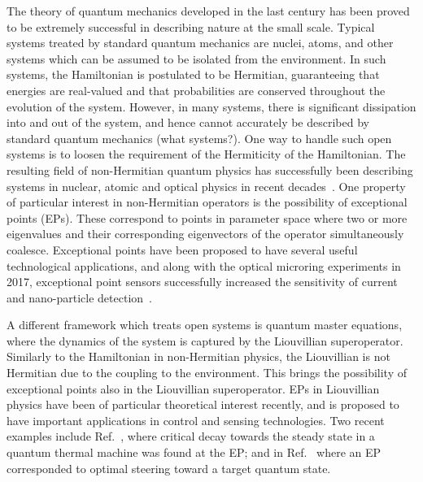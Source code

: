 \documentclass[../main.tex]{subfiles}
\begin{document}
The theory of quantum mechanics developed in the last century has been proved to be extremely successful in describing nature at the small scale. Typical systems treated by standard quantum mechanics are nuclei, atoms, and other systems which can be assumed to be isolated from the environment. In such systems, the Hamiltonian is postulated to be Hermitian, guaranteeing that energies are real-valued and that probabilities are conserved throughout the evolution of the system. However, in many systems, there is significant dissipation into and out of the system, and hence cannot accurately be described by standard quantum mechanics (what systems?). One way to handle such open systems is to loosen the requirement of the Hermiticity of the Hamiltonian. The resulting field of non-Hermitian quantum physics has successfully been describing systems in nuclear, atomic and optical physics in recent decades~\cite{nonHermrev}. One property of particular interest in non-Hermitian operators is the possibility of exceptional points (EPs). These correspond to points in parameter space where two or more eigenvalues and their corresponding eigenvectors of the operator simultaneously coalesce. Exceptional points have been proposed to have several useful technological applications, and along with the optical microring experiments in 2017, exceptional point sensors successfully increased the sensitivity of current and nano-particle detection~\cite{microring1, microring2}.

A different framework which treats open systems is quantum master equations, where the dynamics of the system is captured by the Liouvillian superoperator. Similarly to the Hamiltonian in non-Hermitian physics, the Liouvillian is not Hermitian due to the coupling to the environment. This brings the possibility of exceptional points also in the Liouvillian superoperator. EPs in Liouvillian physics have been of particular theoretical interest recently, and is proposed to have important applications in control and sensing technologies. Two recent examples include Ref.~\cite{thermal}, where critical decay towards the steady state in a quantum thermal machine was found at the EP; and in Ref.~\cite{steering} where an EP corresponded to optimal steering toward a target quantum state. 
\end{document}
